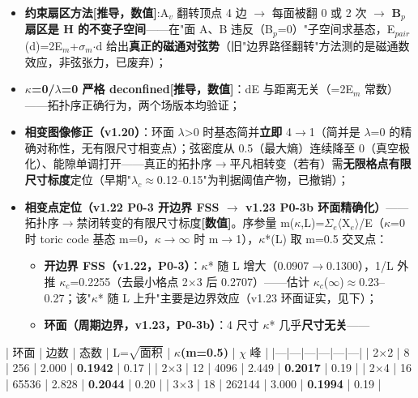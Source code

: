 \documentclass[12pt]{article}
\newcommand{\mtag}[1]{\textbf{[#1]}}
\newcommand{\down}[1]{\ensuremath{_{#1}}}
\begin{document}
\begin{itemize}
\item \textbf{约束扇区方法\mtag{推导，数值}}:A\down{v} 翻转顶点 4 边 \ensuremath{\to} 每面被翻 0 或 2 次 \ensuremath{\to} \textbf{B\down{p} 扇区是 H 的不变子空间}------在"面 A、B 违反（B\down{p}=0）"子空间求基态，E\down{pair}(d)=2E\down{m}+\ensuremath{\sigma}\down{m}\ensuremath{\cdot}d 给出\textbf{真正的磁通对弦势}（旧"边界路径翻转"方法测的是磁通数效应，非弦张力，已废弃）；
\item \textbf{\ensuremath{\kappa}=0/\ensuremath{\lambda}=0 严格 deconfined}\mtag{推导，数值}：dE 与距离无关（=2E\down{m} 常数）------拓扑序正确行为，两个场版本均验证；
\item \textbf{相变图像修正（v1.20）}：环面 \ensuremath{\lambda}>0 时基态简并\textbf{立即} 4\ensuremath{\to}1（简并是 \ensuremath{\lambda}=0 的精确对称性，无有限尺寸相变点）；弦密度从 0.5（最大熵）连续降至 0（真空极化）、能隙单调打开------真正的拓扑序\ensuremath{\to}平凡相转变（若有）需\textbf{无限格点有限尺寸标度}定位（早期"\ensuremath{\lambda}\down{c}\ensuremath{\approx}0.12--0.15"为判据阈值产物，已撤销）；
\item \textbf{相变点定位（v1.22 P0-3 开边界 FSS \ensuremath{\to} v1.23 P0-3b 环面精确化）}------拓扑序\ensuremath{\to}禁闭转变的有限尺寸标度\mtag{数值}。序参量 m(\ensuremath{\kappa},L)=\ensuremath{\Sigma}\down{e}\ensuremath{\langle}X\down{e}\ensuremath{\rangle}/E（\ensuremath{\kappa}=0 时 toric code 基态 m=0，\ensuremath{\kappa}\ensuremath{\to}\ensuremath{\infty} 时 m\ensuremath{\to}1），\ensuremath{\kappa}*(L) 取 m=0.5 交叉点：
\begin{itemize}
\item \textbf{开边界 FSS（v1.22，P0-3）}：\ensuremath{\kappa}* 随 L 增大（0.0907\ensuremath{\to}0.1300），1/L 外推 \ensuremath{\kappa}\down{c}=0.2255（去最小格点 2\ensuremath{\times}3 后 0.2707）------估计 \ensuremath{\kappa}\down{c}(\ensuremath{\infty})\ensuremath{\approx}0.23--0.27；该"\ensuremath{\kappa}* 随 L 上升"主要是边界效应（v1.23 环面证实，见下）；
\item \textbf{环面（周期边界，v1.23，P0-3b）}：4 尺寸 \ensuremath{\kappa}* 几乎\textbf{尺寸无关}------
\end{itemize}
\end{itemize}

    | 环面 | 边数 | 态数 | L=\ensuremath{\sqrt{面积}} | \textbf{\ensuremath{\kappa}\*(m=0.5)} | \ensuremath{\chi} 峰 |
    |---|---|---|---|---|---|
    | 2\ensuremath{\times}2 | 8 | 256 | 2.000 | \textbf{0.1942} | 0.17 |
    | 2\ensuremath{\times}3 | 12 | 4096 | 2.449 | \textbf{0.2017} | 0.19 |
    | 2\ensuremath{\times}4 | 16 | 65536 | 2.828 | \textbf{0.2044} | 0.20 |
    | 3\ensuremath{\times}3 | 18 | 262144 | 3.000 | \textbf{0.1994} | 0.19 |
\end{document}
